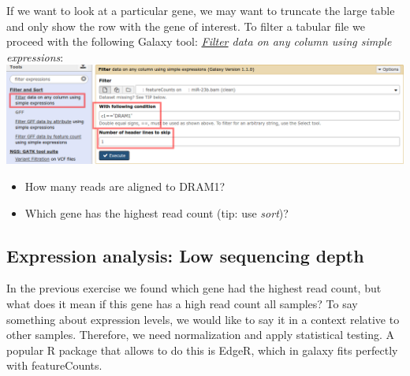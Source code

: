 If we want to look at a particular gene, we may want to truncate the large table and only show the row with the gene of interest.
To filter a tabular file we proceed with the following Galaxy tool: 
\textit{\underline{Filter} data on any column using simple expressions}:\\
\includegraphics[width=\textwidth]{figures/expression_02.png}\\
\begin{itemize}
	\item How many reads are aligned to DRAM1?
	\item Which gene has the highest read count (tip: use \textit{sort})?
\end{itemize}

\subsection{Expression analysis: Low sequencing depth}
In the previous exercise we found which gene had the highest read count, but what does it mean if this gene has a high read count all samples?
To say something about expression levels, we would like to say it in a context relative to other samples.
Therefore, we need normalization and apply statistical testing.
A popular R package that allows to do this is EdgeR, which in galaxy fits perfectly with featureCounts.

